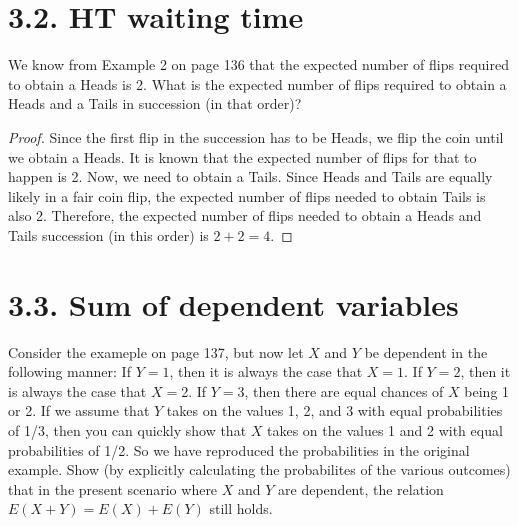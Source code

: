\section*{3.2. HT waiting time}
We know from Example 2 on page 136 that the expected number of flips required to obtain a Heads is 2. 
What is the expected number of flips required to obtain a Heads and a Tails in succession (in that order)?

\vspace{1em}

\begin{proof}
    Since the first flip in the succession has to be Heads, we flip the coin until we obtain a Heads. 
    It is known that the expected number of flips for that to happen is 2. Now, we need to obtain a 
    Tails. Since Heads and Tails are equally likely in a fair coin flip, the expected number of flips
    needed to obtain Tails is also 2. Therefore, the expected number of flips needed to obtain a 
    Heads and Tails succession (in this order) is $2 + 2 = 4$.
\end{proof}

\section*{3.3. Sum of dependent variables}
Consider the exameple on page 137, but now let $X$ and $Y$ be dependent in the following
manner: If $Y = 1$, then it is always the case that $X = 1$. If  $Y = 2$, then it is always the
case that $X = 2$. If $Y = 3$, then there are equal chances of $X$ being 1 or 2. If we assume that 
$Y$ takes on the values 1, 2, and 3 with equal probabilities of 1/3, then you can quickly show
that $X$ takes on the values 1 and 2 with equal probabilities of 1/2. So we have reproduced
the probabilities in the original example. Show (by explicitly calculating the probabilites of
the various outcomes) that in the present scenario where $X$ and $Y$ are dependent, the relation
$E(X + Y) = E(X) + E(Y)$ still holds.

\vspace{1em}

